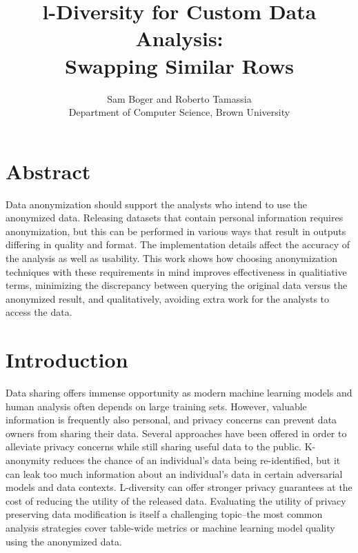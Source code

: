 

\date{}

\title{\Large \bf l-Diversity for Custom Data Analysis:\\
  Swapping Similar Rows}

\author{
{\rm Sam Boger and Roberto Tamassia} \\
Department of Computer Science, Brown University

} %

\maketitle
\section{Abstract}
Data anonymization should support the analysts who intend to use the anonymized data. Releasing datasets that contain personal information requires anonymization, but this can be performed in various ways that result in outputs differing in quality and format. The implementation details affect the accuracy of the analysis as well as usability. This work shows how choosing anonymization techniques with these requirements in mind improves effectiveness in qualitiative terms, minimizing the discrepancy between querying the original data versus the anonymized result, and qualitatively, avoiding extra work for the analysts to access the data.

\section{Introduction}
Data sharing offers immense opportunity as modern machine learning models and human analysis often depends on large training sets. However, valuable information is frequently also personal, and privacy concerns can prevent data owners from sharing their data. Several approaches have been offered in order to alleviate privacy concerns while still sharing useful data to the public. K-anonymity reduces the chance of an individual’s data being re-identified, but it can leak too much information about an individual's data in certain adversarial models and data contexts. L-diversity can offer stronger privacy guarantees at the cost of reducing the utility of the released data. Evaluating the utility of privacy preserving data modification is itself a challenging topic--the most common analysis strategies cover table-wide metrics or machine learning model quality using the anonymized data.


